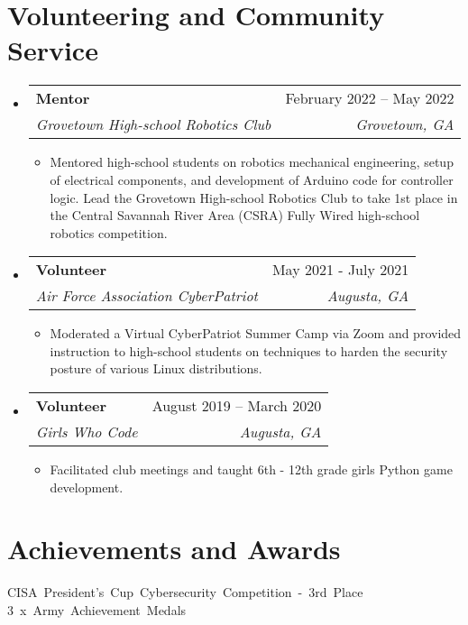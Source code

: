 \documentclass[letterpaper,11pt]{article}
\makeatletter
\newcommand{\resumeItemBulletless}[1]{
  \item[] \small{
    {#1 \vspace{-2pt}}
  }
}
\newcommand{\resumeSubheading}[4]{
  \vspace{-2pt}\item
    \begin{tabular*}{0.97\textwidth}[t]{l@{\extracolsep{\fill}}r}
      \textbf{#1} & #2 \\
      \textit{\small#3} & \textit{\small #4} \\
    \end{tabular*}\vspace{-7pt}
}
\newcommand{\resumeSubHeadingListStart}{\begin{itemize}[leftmargin=0.15in, label={}]}
\newcommand{\resumeSubHeadingListEnd}{\end{itemize}}
\newcommand{\resumeItemListStart}{\begin{itemize}[rightmargin=\dimexpr\linewidth-17cm-\leftmargin\relax]}
\newcommand{\resumeItemListEnd}{\end{itemize}\vspace{-5pt}}
\makeatother
\begin{document}
\section{\textbf{Volunteering and Community Service}}
\resumeSubHeadingListStart

\resumeSubheading
{Mentor}{February 2022 – May 2022}
{Grovetown High-school Robotics Club}{Grovetown, GA}
\resumeItemListStart
\resumeItemBulletless{Mentored high-school students on robotics mechanical engineering, setup of electrical components, and development of Arduino code for controller logic. Lead the Grovetown High-school Robotics Club to take 1st place in the Central Savannah River Area (CSRA) Fully Wired high-school robotics competition.}
\resumeItemListEnd

\resumeSubheading
{Volunteer}{May 2021 - July 2021}
{Air Force Association CyberPatriot}{Augusta, GA}
\resumeItemListStart
\resumeItemBulletless{Moderated a Virtual CyberPatriot Summer Camp via Zoom and provided instruction to high-school students on techniques to harden the security posture of various Linux distributions.}
\resumeItemListEnd

\resumeSubheading
{Volunteer}{August 2019 – March 2020}
{Girls Who Code}{Augusta, GA}
\resumeItemListStart
\resumeItemBulletless{Facilitated club meetings and taught 6th - 12th grade girls Python game development.}
\resumeItemListEnd

\resumeSubHeadingListEnd

\section{\textbf{Achievements and Awards}}
\setlength{\columnsep}{50pt}
\begin{itemize}[noitemsep]
	\small{\item[] {\mbox{CISA President's Cup Cybersecurity Competition - 3rd Place} \hspace{1cm}
		\mbox{3 x Army Achievement Medals}
		}}
\end{itemize}

\end{document}
